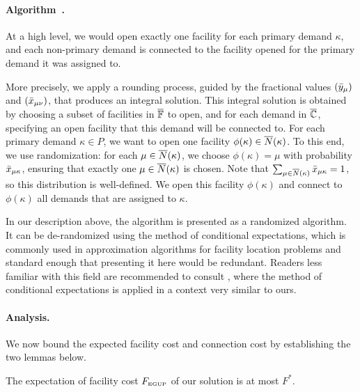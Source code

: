 \documentclass[11pt]{article}
\begin{document}
\paragraph{Algorithm~{\EGUP.}}
At a high level, we would open exactly one facility for each
primary demand $\kappa$, and each non-primary demand is
connected to the facility opened for the primary demand it
was assigned to.

More precisely, we apply a rounding process, guided by the
fractional values $({\bar y}_{\mu})$ and $({\bar x}_{\mu\nu})$,
that produces an integral solution. This integral solution
is obtained by choosing a subset of facilities in
$\overline{\mathbb{F}}$ to open, and for each demand in $\overline{\mathbb{C}}$,
specifying an open facility that this demand will be
connected to.  For each primary demand $\kappa\in P$, we
want to open one facility $\phi(\kappa) \in
{\overline{N}}(\kappa)$. To this end, we use randomization: for each
$\mu\in{\overline{N}}(\kappa)$, we choose $\phi(\kappa) = \mu$ with
probability ${\bar x}_{\mu\kappa}$, ensuring that exactly one
$\mu \in {\overline{N}}(\kappa)$ is chosen. Note that
$\sum_{\mu\in{\overline{N}}(\kappa)}{\bar x}_{\mu\kappa}=1$, so this
distribution is well-defined.  We open this facility
$\phi(\kappa)$ and connect to $\phi(\kappa)$ all demands
that are assigned to $\kappa$.

In our description above, the algorithm is presented as a
randomized algorithm. It can be de-randomized using the
method of conditional expectations, which is commonly used
in approximation algorithms for facility location problems
and standard enough that presenting it here would be
redundant. Readers less familiar with this field are
recommended to consult \cite{ChudakS04}, where the method of
conditional expectations is applied in a context very
similar to ours.


\paragraph{Analysis.}
We now bound the expected facility cost and connection cost
by establishing the two lemmas below.


\begin{lemma}\label{lemma:3fac}
The expectation of facility cost $F_{\mbox{\tiny\rm EGUP}}$ of our solution is
  at most $F^\ast$.
\end{lemma}
\end{document}
